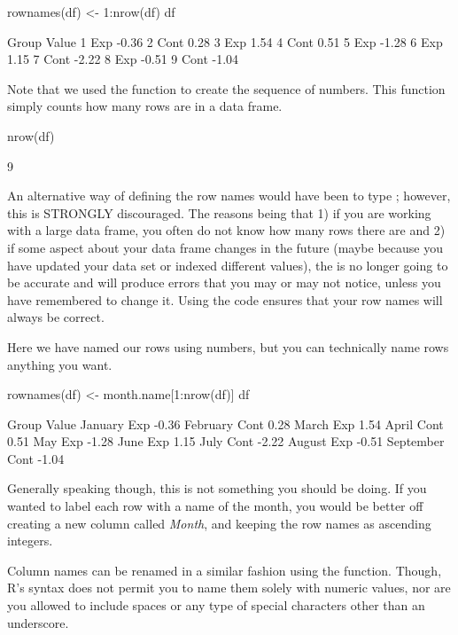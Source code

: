 \begin{inR}
rownames(df) <- 1:nrow(df)
df
\end{inR}
\begin{outR}
  Group Value
1   Exp -0.36
2  Cont  0.28
3   Exp  1.54
4  Cont  0.51
5   Exp -1.28
6   Exp  1.15
7  Cont -2.22
8   Exp -0.51
9  Cont -1.04
\end{outR}

Note that we used the function  to create the sequence of numbers. This function simply counts how many rows are in a data frame.

\begin{inR}
nrow(df)
\end{inR}
\begin{outR}
[1] 9
\end{outR}

An alternative way of defining the row names would have been to type ; however, this is STRONGLY discouraged.  The reasons being that 1) if you are working with a large data frame, you often do not know how many rows there are and 2) if some aspect about your data frame changes in the future (maybe because you have updated your data set or indexed different values), the  is no longer going to be accurate and will produce errors that you may or may not notice, unless you have remembered to change it. Using the code  ensures that your row names will always be correct.

Here we have named our rows using numbers, but you can technically name rows anything you want.
\begin{inR}
rownames(df) <- month.name[1:nrow(df)]
df
\end{inR}
\begin{outR}
          Group Value
January     Exp -0.36
February   Cont  0.28
March       Exp  1.54
April      Cont  0.51
May         Exp -1.28
June        Exp  1.15
July       Cont -2.22
August      Exp -0.51
September  Cont -1.04
\end{outR}

Generally speaking though, this is not something you should be doing.  If you wanted to label each row with a name of the month, you would be better off creating a new column called \textit{Month}, and keeping the row names as ascending integers.

Column names can be renamed in a similar fashion using the  function. Though, R's syntax does not permit you to name them solely with numeric values, nor are you allowed to include spaces or any type of special characters other than an underscore.

